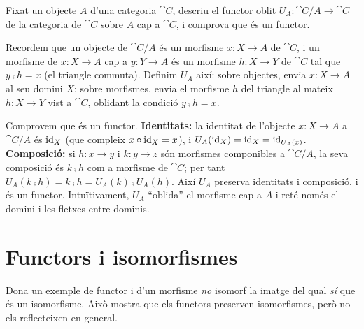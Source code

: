 \begin{exercici}
Fixat un objecte $A$ d'una categoria $\cat{C}$, descriu el functor oblit $U_A\colon\cat{C}/A\to\cat{C}$ de la categoria de $\cat{C}$ sobre $A$ cap a $\cat{C}$, i comprova que és un functor.
\end{exercici}

\begin{solucio}
Recordem que un objecte de $\cat{C}/A$ és un morfisme $x\colon X\to A$ de $\cat{C}$, i un morfisme de $x\colon X\to A$ cap a $y\colon Y\to A$ és un morfisme $h\colon X\to Y$ de $\cat{C}$ tal que $y\comp h=x$ (el triangle commuta). Definim $U_A$ així: sobre objectes, envia $x\colon X\to A$ al seu domini $X$; sobre morfismes, envia el morfisme $h$ del triangle al mateix $h\colon X\to Y$ vist a $\cat{C}$, oblidant la condició $y\comp h=x$.

Comprovem que és un functor. \textbf{Identitats:} la identitat de l'objecte $x\colon X\to A$ a $\cat{C}/A$ és $\operatorname{id}_X$ (que compleix $x\circ\operatorname{id}_X=x$), i $U_A(\operatorname{id}_X)=\operatorname{id}_X=\operatorname{id}_{U_A(x)}$. \textbf{Composició:} si $h\colon x\to y$ i $k\colon y\to z$ són morfismes componibles a $\cat{C}/A$, la seva composició és $k\comp h$ com a morfisme de $\cat{C}$; per tant $U_A(k\comp h)=k\comp h=U_A(k)\comp U_A(h)$. Així $U_A$ preserva identitats i composició, i és un functor. Intuïtivament, $U_A$ \enquote{oblida} el morfisme cap a $A$ i reté només el domini i les fletxes entre dominis.
\end{solucio}

\section{Functors i isomorfismes}

\begin{exercici}
Dona un exemple de functor i d'un morfisme \emph{no} isomorf la imatge del qual \emph{sí} que és un isomorfisme. Això mostra que els functors preserven isomorfismes, però no els reflecteixen en general.
\end{exercici}

